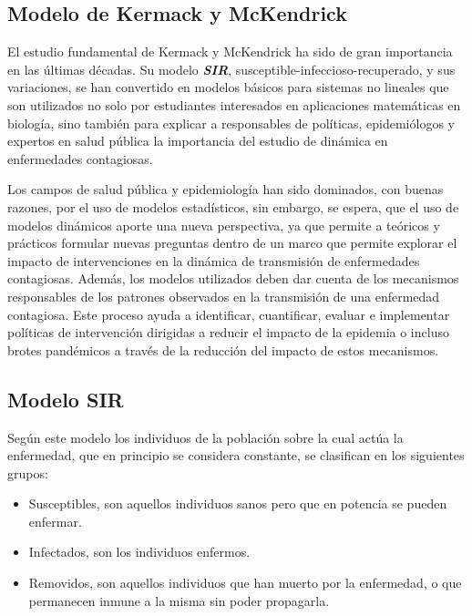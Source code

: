 \documentclass[journal]{IEEEtran}
\begin{document}
\subsection{Modelo de Kermack y McKendrick}

El estudio fundamental de Kermack \cite{Ross} y McKendrick \cite{Kermack} ha sido de gran importancia en las últimas décadas. Su modelo \textbf{\textit{SIR}}, susceptible-infeccioso-recuperado, y sus variaciones, 
se han convertido en modelos básicos para sistemas no lineales que son utilizados no solo por estudiantes interesados en aplicaciones matemáticas en biología,
sino también para explicar a responsables de políticas, epidemiólogos y expertos en salud pública la importancia del estudio de dinámica en enfermedades contagiosas.\newline

Los campos de salud pública y epidemiología han sido dominados, con buenas razones, por el uso de modelos estadísticos, sin embargo, se espera,
que el uso de modelos dinámicos aporte una nueva perspectiva, ya que permite a teóricos y prácticos formular nuevas preguntas dentro de un marco que permite explorar el impacto de intervenciones en la dinámica de transmisión de enfermedades contagiosas. 
Además, los modelos utilizados deben dar cuenta de los mecanismos responsables de los patrones observados en la transmisión de una enfermedad contagiosa.
Este proceso ayuda a identificar, cuantificar, evaluar e implementar políticas de intervención dirigidas a reducir el impacto de la epidemia o incluso brotes pandémicos a través de la reducción del impacto de estos mecanismos.

\subsection{Modelo SIR}

Según este modelo los individuos de la población
sobre la cual actúa la enfermedad, que en principio se considera constante, se
clasifican en los siguientes grupos:

\begin{itemize}
  \item Susceptibles, son aquellos individuos sanos pero que en potencia se pueden
  enfermar.
  \item Infectados, son los individuos enfermos.
  \item Removidos, son aquellos individuos que han muerto por la enfermedad, o
  que permanecen inmune a la misma sin poder propagarla.
\end{itemize}
\end{document}

